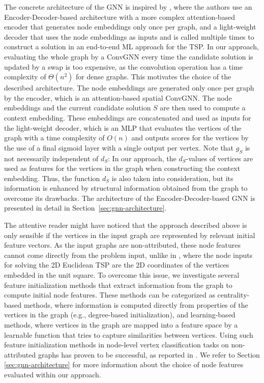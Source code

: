 \documentclass[draft,final]{vutinfth} %
\begin{document}
The concrete architecture of the GNN is inspired by \cite{Kool2019}, where the authors use an Encoder-Decoder-based architecture with a more complex attention-based encoder that generates node embeddings only once per graph, and a light-weight decoder that uses the node embeddings as inputs and is called multiple times to construct a solution in an end-to-end ML approach for the TSP. 
In our approach, evaluating the whole graph by a ConvGNN every time the candidate solution is updated by a swap is too expensive, as the convolution operation has a time complexity of $\Theta(n^2)$ for dense graphs. This motivates the choice of the described architecture. The node embeddings are generated only once per graph by the encoder, which is an attention-based spatial ConvGNN. The node embeddings and the current candidate solution $S$ are then used to compute a context embedding. These embeddings are concatenated and used as inputs for the light-weight decoder, which is an MLP that evaluates the vertices of the graph with a time complexity of $O(n)$ and outputs scores for the vertices by the use of a final sigmoid layer with a single output per vertex. 
Note that $g_S$ is not necessarily independent of $d_S$: In our approach, the $d_S$-values of vertices are used as features for the vertices in the graph when constructing the context embedding. Thus, the function $d_S$ is also taken into consideration, but its information is enhanced by structural information obtained from the graph to overcome its drawbacks. 
The architecture of the Encoder-Decoder-based GNN is presented in detail in Section~\ref{sec:gnn-architecture}. 

The attentive reader might have noticed that the approach described above is only sensible if the vertices in the input graph are represented by relevant initial feature vectors. As the input graphs are non-attributed, these node features cannot come directly from the problem input, unlike in \cite{Kool2019}, where the node inputs for solving the 2D Euclidean TSP are the 2D coordinates of the vertices embedded in the unit square. 
To overcome this issue, we investigate several feature initialization methods that extract information from the graph to compute initial node features. These methods can be categorized as centrality-based methods, where information is computed directly from properties of the vertices in the graph (e.g., degree-based initialization), and learning-based methods, where vertices in the graph are mapped into a feature space by a learnable function that tries to capture similarities between vertices. Using such feature initialization methods in node-level vertex classification tasks on non-attributed graphs has proven to be successful, as reported in \cite{Duong2019}. We refer to Section \ref{sec:gnn-architecture} for more information about the choice of node features evaluated within our approach. 
\end{document}
